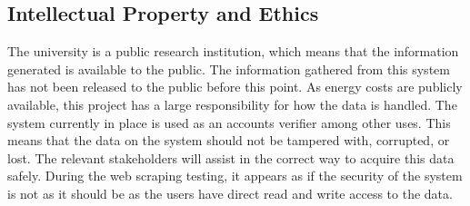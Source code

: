 \documentclass[12pt,onecolumn]{IEEEtran}
\begin{document}
\subsection{Intellectual Property and Ethics} \label{sec:IntellectualPropertyEthics}

The university is a public research institution, which means that the information generated is available to the public. The information gathered from this system has not been released to the public before this point.  As energy costs are publicly available, this project has a large responsibility for how the data is handled. The system currently in place is used as an accounts verifier among other uses. This means that the data on the system should not be tampered with, corrupted, or lost.  The relevant stakeholders will assist in the correct way to acquire this data safely. During the web scraping testing, it appears as if the security of the system is not as it should be as the users have direct read and write access to the data.
\end{document}
